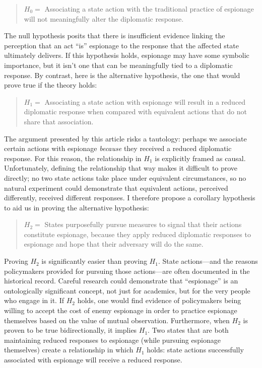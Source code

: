 \documentclass[14pt]{extarticle}
\begin{document}
\begin{quote}
$H_0 =$ Associating a state action with the traditional practice of espionage will not meaningfully alter the diplomatic response.
\end{quote}

The null hypothesis posits that there is insufficient evidence linking the perception that an act \enquote{is} espionage to the response that the affected state ultimately delivers. If this hypothesis holds, espionage may have some symbolic importance, but it isn't one that can be meaningfully tied to a diplomatic response. By contrast, here is the alternative hypothesis, the one that would prove true if the theory holds:

\begin{quote}
$H_1 =$ Associating a state action with espionage will result in a reduced diplomatic response when compared with equivalent actions that do not share that association.
\end{quote}

The argument presented by this article risks a tautology: perhaps we associate certain actions with espionage \emph{because} they received a reduced diplomatic response. For this reason, the relationship in $H_1$ is explicitly framed as causal. Unfortunately, defining the relationship that way makes it difficult to prove directly; no two state actions take place under equivalent circumstances, so no natural experiment could demonstrate that equivalent actions, perceived differently, received different responses. I therefore propose a corollary hypothesis to aid us in proving the alternative hypothesis:

\begin{quote}
$H_2 =$ States purposefully pursue measures to signal that their actions constitute espionage, because they apply reduced diplomatic responses to espionage and hope that their adversary will do the same.
\end{quote}

Proving $H_2$ is significantly easier than proving $H_1$. State actions---and the reasons policymakers provided for pursuing those actions---are often documented in the historical record. Careful research could demonstrate that \enquote{espionage} is an ontologically significant concept, not just for academics, but for the very people who engage in it. If $H_2$ holds, one would find evidence of policymakers being willing to accept the cost of enemy espionage in order to practice espionage themselves based on the value of mutual observation. Furthermore, when $H_2$ is proven to be true bidirectionally, it implies $H_1$. Two states that are both maintaining reduced responses to espionage (while pursuing espionage themselves) create a relationship in which $H_1$ holds: state actions successfully associated with espionage will receive a reduced response.
\end{document}
